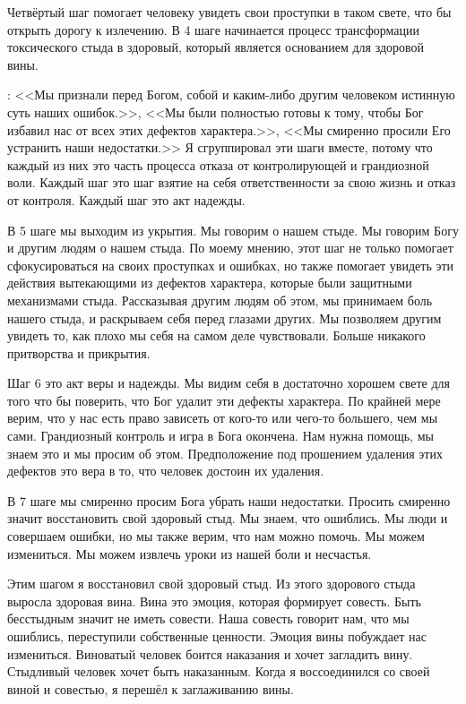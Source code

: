 \documentclass[10pt, fleqn]{article}
\begin{document}
Четвёртый шаг помогает человеку увидеть свои проступки в таком свете, что бы открыть дорогу к излечению. В 4 шаге начинается процесс трансформации токсического стыда в здоровый, который является основанием для здоровой вины.

: <<Мы признали перед Богом, собой и каким-либо другим человеком истинную суть наших ошибок.>>, <<Мы были полностью готовы к тому, чтобы Бог избавил нас от всех этих дефектов характера.>>, <<Мы смиренно просили Его устранить наши недостатки.>> Я сгруппировал эти шаги вместе, потому что каждый из них это часть процесса отказа от контролирующей и грандиозной воли. Каждый шаг это шаг взятие на себя ответственности за свою жизнь и отказ от контроля. Каждый шаг это акт надежды.

В 5 шаге мы выходим из укрытия. Мы говорим о нашем стыде. Мы говорим Богу и другим людям о нашем стыда. По моему мнению, этот шаг не только помогает сфокусироваться на своих проступках и ошибках, но также помогает увидеть эти действия вытекающими из дефектов характера, которые были защитными механизмами стыда. Рассказывая другим людям об этом, мы принимаем боль нашего стыда, и раскрываем себя перед глазами других. Мы позволяем другим увидеть то, как плохо мы себя на самом деле чувствовали. Больше никакого притворства и прикрытия.

Шаг 6 это акт веры и надежды. Мы видим себя в достаточно хорошем свете для того что бы поверить, что Бог удалит эти дефекты характера. По крайней мере верим, что у нас есть право зависеть от кого-то или чего-то большего, чем мы сами. Грандиозный контроль и игра в Бога окончена. Нам нужна помощь, мы знаем это и мы просим об этом. Предположение под прошением удаления этих дефектов это вера в то, что человек достоин их удаления.

В 7 шаге мы смиренно просим Бога убрать наши недостатки. Просить смиренно значит восстановить свой здоровый стыд. Мы знаем, что ошиблись. Мы люди и совершаем ошибки, но мы также верим, что нам можно помочь. Мы можем измениться. Мы можем извлечь уроки из нашей боли и несчастья.

Этим шагом я восстановил свой здоровый стыд. Из этого здорового стыда выросла здоровая вина. Вина это эмоция, которая формирует совесть. Быть бесстыдным значит не иметь совести. Наша совесть говорит нам, что мы ошиблись, переступили собственные ценности. Эмоция вины побуждает нас измениться. Виноватый человек боится наказания и хочет загладить вину. Стыдливый человек хочет быть наказанным. Когда я воссоединился со своей виной и совестью, я перешёл к заглаживанию вины.
\end{document}
